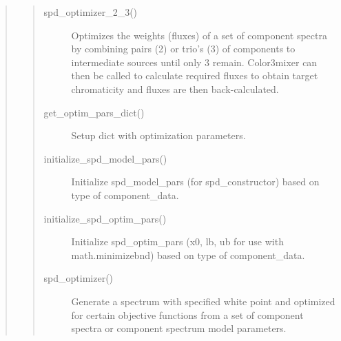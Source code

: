 \documentclass[letterpaper,10pt,english]{sphinxmanual}
\begin{document}
\begin{quote}
\begin{quote}
\begin{description}
\item[{spd\_optimizer\_2\_3()}] \leavevmode
Optimizes the weights (fluxes) of a set of component 
spectra by combining pairs (2) or trio’s (3) of 
components to intermediate sources until only 3 remain.
Color3mixer can then be called to calculate required 
fluxes to obtain target chromaticity and fluxes are 
then back-calculated.

\item[{get\_optim\_pars\_dict()}] \leavevmode
Setup dict with optimization parameters.

\item[{initialize\_spd\_model\_pars()}] \leavevmode
Initialize spd\_model\_pars (for spd\_constructor)
based on type of component\_data.

\item[{initialize\_spd\_optim\_pars()}] \leavevmode
Initialize spd\_optim\_pars (x0, lb, ub for use
with math.minimizebnd) based on type 
of component\_data.

\item[{spd\_optimizer()}] \leavevmode
Generate a spectrum with specified white point and optimized
for certain objective functions from a set of component 
spectra or component spectrum model parameters.

\end{description}\end{quote}
\end{quote}
\end{document}
